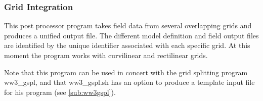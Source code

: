 \vsssub
\subsubsection{Grid Integration} \label{sub:ww3gint}
\vsssub
{}

\vspace{\baselineskip}
\noindent
This post processor program takes field data from several overlapping grids
and produces a unified output file. The different model definition and field
output files are identified by the unique identifier associated with each
specific grid. At this moment the program works with curvilinear and
rectilinear grids.


\vspace{\baselineskip}
\vspace{\baselineskip}
\noindent
Note that this program can be used in concert with the grid splitting program
{\file ww3\_gspl}, and that {\file ww3\_gspl.sh} has an option to produce a
template input file for his program (see \para\ref{sub:ww3gspl}).

\pb
